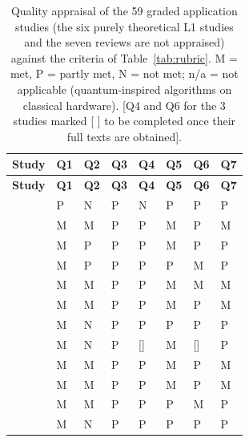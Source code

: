 \documentclass[acmsmall,screen,review]{acmart}
\newcommand{\fillin}[1]{{\color{red}[#1]}}
\begin{document}
{\footnotesize
\begin{longtable}{@{}>{\raggedright\arraybackslash}p{0.300\dimexpr\linewidth-14\tabcolsep\relax}>{\centering\arraybackslash}p{0.100\dimexpr\linewidth-14\tabcolsep\relax}>{\centering\arraybackslash}p{0.100\dimexpr\linewidth-14\tabcolsep\relax}>{\centering\arraybackslash}p{0.100\dimexpr\linewidth-14\tabcolsep\relax}>{\centering\arraybackslash}p{0.100\dimexpr\linewidth-14\tabcolsep\relax}>{\centering\arraybackslash}p{0.100\dimexpr\linewidth-14\tabcolsep\relax}>{\centering\arraybackslash}p{0.100\dimexpr\linewidth-14\tabcolsep\relax}>{\centering\arraybackslash}p{0.100\dimexpr\linewidth-14\tabcolsep\relax}@{}}
\caption{Quality appraisal of the 59 graded application studies (the six purely theoretical L1 studies and the seven reviews are not appraised) against the criteria of Table~\ref{tab:rubric}. M = met, P = partly met, N = not met; n/a = not applicable (quantum-inspired algorithms on classical hardware). \fillin{Q4 and Q6 for the 3 studies marked [ ] to be completed once their full texts are obtained}.}\label{tab:appraisal}\\
\toprule
\textbf{Study} & \textbf{Q1} & \textbf{Q2} & \textbf{Q3} & \textbf{Q4} & \textbf{Q5} & \textbf{Q6} & \textbf{Q7} \\ \midrule
\endfirsthead
\toprule
\textbf{Study} & \textbf{Q1} & \textbf{Q2} & \textbf{Q3} & \textbf{Q4} & \textbf{Q5} & \textbf{Q6} & \textbf{Q7} \\ \midrule
\endhead
\citet{Dong2006} & P & N & P & N & P & P & P \\
\citet{Ohzeki2019} & M & M & P & P & M & P & M \\
\citet{Quang2025} & M & P & P & P & M & P & P \\
\citet{Clark2019} & M & P & P & P & P & M & P \\
\citet{Smierzchalski2024} & M & M & P & P & M & M & M \\
\citet{Leib2023} & M & M & P & P & M & P & M \\
\citet{AtchadeAdelomou2021} & M & N & P & P & P & P & P \\
\citet{Windmann2023} & M & N & P & \fillin{} & M & \fillin{} & P \\
\citet{Schuetz2022} & M & M & P & P & M & P & M \\
\citet{Willmann2025} & M & M & P & P & M & P & M \\
\citet{Osaba2025} & M & M & P & P & P & M & P \\
\citet{Otani2025} & M & N & P & P & P & P & P \\

\end{longtable}}
\end{document}
